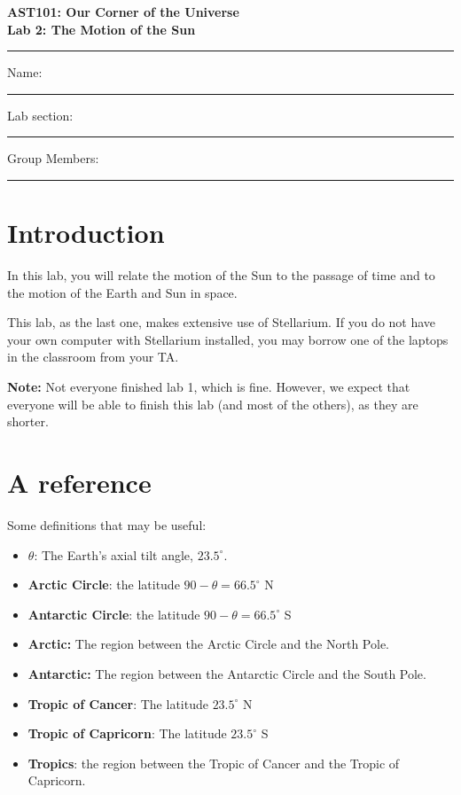 \documentclass[11pt]{article}
\begin{document}
\begin{center}
\textbf{\Large
AST101: Our Corner of the Universe \\
\vspace*{0.1cm}
Lab 2: The Motion of the Sun
}
\end{center}

\vspace*{0.5cm}

\hrule
{\Large Name:}\vspace*{0.5cm}\\\hrule
{\Large Lab section:}\vspace*{0.5cm}\\\hrule
{\Large Group Members:}\vspace*{0.5cm}\\\hrule
\vspace*{0.5cm}

\section{Introduction}


In this lab, you will relate the motion of the Sun to the passage of time and to the motion of the Earth and Sun in space.

This lab, as the last one, makes extensive use of Stellarium. 
If you do not have your own computer with Stellarium installed, you may borrow one of the laptops in the classroom from your TA.

{\bf Note:} Not everyone finished lab 1, which is fine. However, we expect that everyone will be able to finish this lab (and most of the others), as they are shorter.

\section{A reference}


Some definitions that may be useful:

\begin{itemize}
\item {\bf $\theta$}: The Earth's axial tilt angle, $23.5^\circ$.
\item {\bf Arctic Circle}: the latitude $90-\theta = 66.5^\circ$ N
\item {\bf Antarctic Circle}: the latitude $90-\theta = 66.5^\circ$ S
\item {\bf Arctic:} The region between the Arctic Circle and the North Pole.
\item {\bf Antarctic:} The region between the Antarctic Circle and the South Pole.
\item {\bf Tropic of Cancer}: The latitude $23.5^\circ$ N
\item {\bf Tropic of Capricorn}: The latitude $23.5^\circ$ S
\item {\bf Tropics}: the region between the Tropic of Cancer and the Tropic of Capricorn.
\end{itemize}
\end{document}
